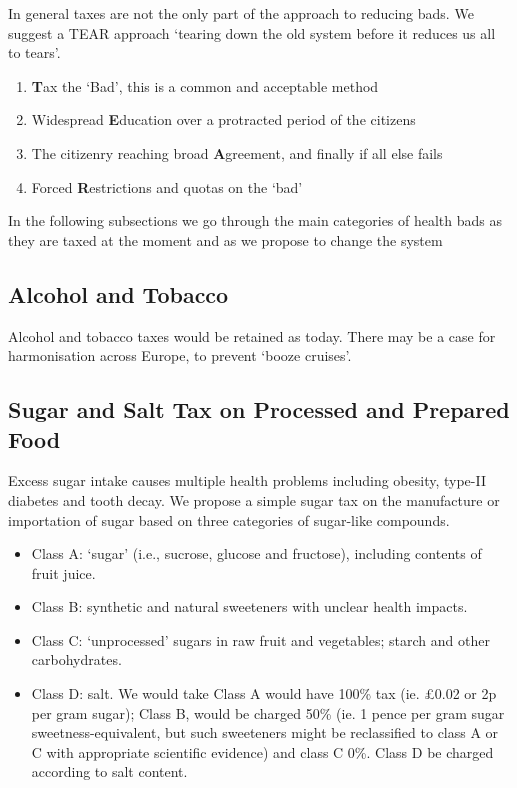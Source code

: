 \documentclass[]{tufte-handout}
\providecommand{\tightlist}{%
  \setlength{\itemsep}{0pt}\setlength{\parskip}{0pt}}
\begin{document}
In general taxes are not the only part of the approach to reducing bads.
We suggest a TEAR approach `tearing down the old system before it
reduces us all to tears'.

\begin{enumerate}
\def\labelenumi{\arabic{enumi})}
\item
  \textbf{T}ax the `Bad', this is a common and acceptable method
\item
  Widespread \textbf{E}ducation over a protracted period of the citizens
\item
  The citizenry reaching broad \textbf{A}greement, and finally if all
  else fails
\item
  Forced \textbf{R}estrictions and quotas on the `bad'
\end{enumerate}

In the following subsections we go through the main categories of health
bads as they are taxed at the moment and as we propose to change the
system

\hypertarget{alcohol-and-tobacco}{%
\subsection{Alcohol and Tobacco}\label{alcohol-and-tobacco}}

Alcohol and tobacco taxes would be retained as today. There may be a
case for harmonisation across Europe, to prevent `booze cruises'.

\hypertarget{sugar-and-salt-tax-on-processed-and-prepared-food}{%
\subsection{Sugar and Salt Tax on Processed and Prepared
Food}\label{sugar-and-salt-tax-on-processed-and-prepared-food}}

Excess sugar intake causes multiple health problems including obesity,
type-II diabetes and tooth decay. We propose a simple sugar tax on the
manufacture or importation of sugar based on three categories of
sugar-like compounds.

\begin{itemize}
\tightlist
\item
  Class A: `sugar' (i.e., sucrose, glucose and fructose), including
  contents of fruit juice.
\item
  Class B: synthetic and natural sweeteners with unclear health impacts.
\item
  Class C: `unprocessed' sugars in raw fruit and vegetables; starch and
  other carbohydrates.
\item
  Class D: salt. We would take Class A would have 100\% tax (ie. £0.02
  or 2p per gram sugar); Class B, would be charged 50\% (ie. 1 pence per
  gram sugar sweetness-equivalent, but such sweeteners might be
  reclassified to class A or C with appropriate scientific evidence) and
  class C 0\%. Class D be charged according to salt content.
\end{itemize}
\end{document}
